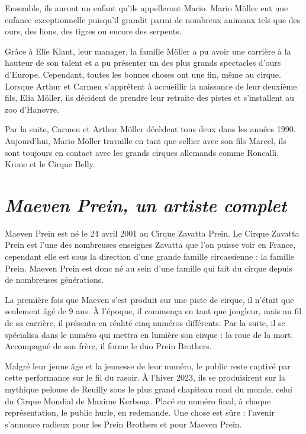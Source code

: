 Ensemble, ils auront un enfant qu’ils appelleront Mario. Mario Möller eut une enfance exceptionnelle puisqu’il grandit parmi de nombreux animaux tels que des ours, des lions, des tigres ou encore des serpents.

Grâce à Elie Klant, leur manager, la famille Möller a pu avoir une carrière à la hauteur de son talent et a pu présenter un des plus grands spectacles d’ours d’Europe. Cependant, toutes les bonnes choses ont une fin, même au cirque. Lorsque Arthur et Carmen s’apprêtent à accueillir la naissance de leur deuxième fils, Elia Möller, ils décident de prendre leur retraite des pistes et s’installent au zoo d'Hanovre.

Par la suite, Carmen et Arthur Möller décèdent tous deux dans les années 1990. Aujourd'hui, Mario Möller travaille en tant que sellier avec son fils Marcel, ils sont toujours en contact avec les grands cirques allemands comme Roncalli, Krone et le Cirque Belly.

\section*{\textit{Maeven Prein, un artiste complet}}
{}

Maeven Prein est né le 24 avril 2001 au Cirque Zavatta Prein. Le Cirque Zavatta Prein est l’une des nombreuses enseignes Zavatta que l’on puisse voir en France, cependant elle est sous la direction d’une grande famille circassienne : la famille Prein. Maeven Prein est donc né au sein d’une famille qui fait du cirque depuis de nombreuses générations.

La première fois que Maeven s'est produit sur une piste de cirque, il n’était que seulement âgé de 9 ans. À l’époque, il commença en tant que jongleur, mais au fil de sa carrière, il présenta en réalité cinq numéros différents. Par la suite, il se spécialisa dans le numéro qui mettra en lumière son cirque : la roue de la mort. Accompagné de son frère, il forme le duo Prein Brothers.

Malgré leur jeune âge et la jeunesse de leur numéro, le public reste captivé par cette performance sur le fil du rasoir. À l’hiver 2023, ils se produisirent sur la mythique pelouse de Reuilly sous le plus grand chapiteau rond du monde, celui du Cirque Mondial de Maxime Kerboua. Placé en numéro final, à chaque représentation, le public hurle, en redemande. Une chose est sûre : l’avenir s’annonce radieux pour les Prein Brothers et pour Maeven Prein.

